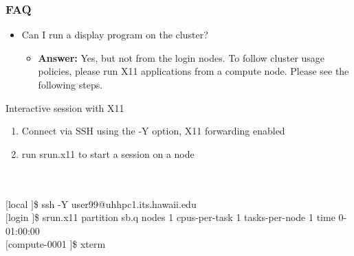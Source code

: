 \begin{frame}	
\frametitle{FAQ}
\begin{itemize}
  \item Can I run a display program on the cluster?
    \begin{itemize}
      \item \textbf{Answer:} Yes, but not from the login nodes.  To follow cluster usage policies, please run X11 applications from a compute node.  Please see the following steps.
\end{itemize}
\end{itemize}
 \begin{block}{Interactive session with X11}\tiny  
       \begin{enumerate}
      \item Connect via SSH using the -Y option, X11 forwarding enabled
      \item run srun.x11 to start a session on a node
      \end{enumerate}
      \
      ~\\
      ~\\
      $[$local \ctilde$]$\$ ssh -Y user99@uhhpc1.its.hawaii.edu	~\\
      $[$login \ctilde$]$\$ srun.x11 \ddash{}partition sb.q \ddash{}nodes 1 \ddash{}cpus-per-task 1 \ddash{}tasks-per-node 1 \ddash{}time 0-01:00:00	~\\
      $[$compute-0001 \ctilde$]$\$ xterm	~\\
 \end{block}

\end{frame}
